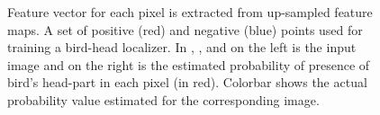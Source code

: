 \documentclass[10pt,twocolumn,letterpaper]{article}
\begin{document}
\begin{figure}
   \centering
   \caption{
 Feature vector for each pixel is extracted from up-sampled feature maps.  A set of positive (red) and negative (blue) points used for training a bird-head localizer.
In , , and  on the left is the input image and on the right is the estimated probability of presence of bird's head-part in each pixel (in red). Colorbar shows the actual probability value estimated for the corresponding image.
}
   \label{fig:results}
\end{figure}
\end{document}
